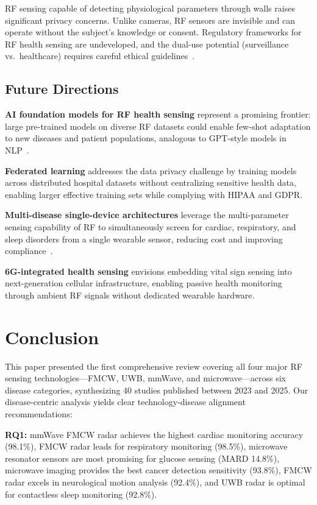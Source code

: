 \documentclass[journal,twoside]{IEEEtran}
\begin{document}
RF sensing capable of detecting physiological parameters through walls raises significant privacy concerns. Unlike cameras, RF sensors are invisible and can operate without the subject's knowledge or consent. Regulatory frameworks for RF health sensing are undeveloped, and the dual-use potential (surveillance vs.\ healthcare) requires careful ethical guidelines~\cite{ref_rf_exposure2023}.

\subsection{Future Directions}

\textbf{AI foundation models for RF health sensing} represent a promising frontier: large pre-trained models on diverse RF datasets could enable few-shot adaptation to new diseases and patient populations, analogous to GPT-style models in NLP~\cite{ref_biogap2025}.

\textbf{Federated learning} addresses the data privacy challenge by training models across distributed hospital datasets without centralizing sensitive health data, enabling larger effective training sets while complying with HIPAA and GDPR.

\textbf{Multi-disease single-device architectures} leverage the multi-parameter sensing capability of RF to simultaneously screen for cardiac, respiratory, and sleep disorders from a single wearable sensor, reducing cost and improving compliance~\cite{ref_mlrf2025}.

\textbf{6G-integrated health sensing} envisions embedding vital sign sensing into next-generation cellular infrastructure, enabling passive health monitoring through ambient RF signals without dedicated wearable hardware.

\section{Conclusion}
\label{sec:conclusion}

This paper presented the first comprehensive review covering all four major RF sensing technologies---FMCW, UWB, mmWave, and microwave---across six disease categories, synthesizing 40 studies published between 2023 and 2025. Our disease-centric analysis yields clear technology-disease alignment recommendations:

\textbf{RQ1:} mmWave FMCW radar achieves the highest cardiac monitoring accuracy (98.1\%), FMCW radar leads for respiratory monitoring (98.5\%), microwave resonator sensors are most promising for glucose sensing (MARD 14.8\%), microwave imaging provides the best cancer detection sensitivity (93.8\%), FMCW radar excels in neurological motion analysis (92.4\%), and UWB radar is optimal for contactless sleep monitoring (92.8\%).
\end{document}

